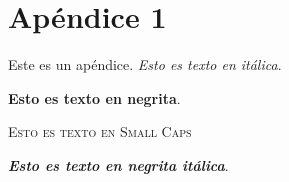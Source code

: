 \chapter{Apéndice 1} \label{app1}
Este es un apéndice.
\textit{Esto es texto en itálica}.

\textbf{Esto es texto en negrita}.

\textsc{Esto es texto en Small Caps}

\textit{\textbf{Esto es texto en negrita itálica}}.
